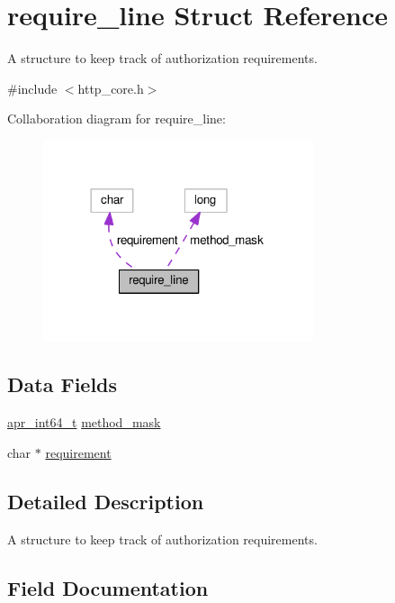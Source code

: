 \hypertarget{structrequire__line}{}\section{require\+\_\+line Struct Reference}
\label{structrequire__line}


A structure to keep track of authorization requirements.  




{\ttfamily \#include $<$http\+\_\+core.\+h$>$}



Collaboration diagram for require\+\_\+line\+:
\nopagebreak
\begin{figure}[H]
\begin{center}
\leavevmode
\includegraphics[width=225pt]{structrequire__line__coll__graph}
\end{center}
\end{figure}
\subsection*{Data Fields}
\begin{DoxyCompactItemize}
\item 
\hyperlink{group__apr__platform_ga4b75afbf973dc6c8aea4ae75b044aa08}{apr\+\_\+int64\+\_\+t} \hyperlink{structrequire__line_a4b0b9f44cdb71b3aaab7bcea2d3b33c5}{method\+\_\+mask}
\item 
char $\ast$ \hyperlink{structrequire__line_a147f21edbd0e2b8af2136b9f9e9054ea}{requirement}
\end{DoxyCompactItemize}


\subsection{Detailed Description}
A structure to keep track of authorization requirements. 

\subsection{Field Documentation}
